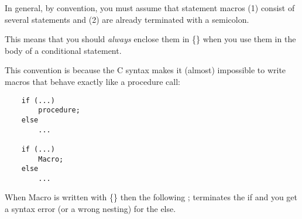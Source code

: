 In general, by convention, you must assume that statement macros
(1) consist of several statements and
(2) are already terminated with a semicolon.

This means that you should {\it always} enclose them in \{\} when you
use them in the body of a conditional statement.

This convention is because the C syntax makes it (almost) impossible
to write macros that behave exactly like a procedure call:
\begin{verbatim}
    if (...)
        procedure;
    else
        ...

    if (...)
        Macro;
    else
        ...
\end{verbatim}

When Macro is written with \{\} then the following ; terminates the if
and you get a syntax error (or a wrong nesting) for the else.



